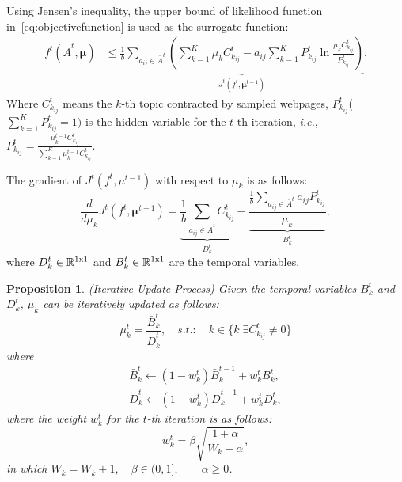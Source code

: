 \documentclass[runningheads]{llncs}
\begin{document}
Using Jensen's inequality, the upper bound of likelihood function in~\eqref{eq:objectivefunction} is used as the surrogate function:
\begin{align}
    f^t(\bar{A}^t,\bm{\mu}) &\leqslant{\underbrace{\frac{1}{b}\sum_{a_{ij} \in \bar{A}^t} \left(\sum_{k=1}^{K}\mu_k C^t_{k_{ij}} - a_{ij}\sum_{k=1}^{K} P^t_{k_{ij}} \ln \frac{\mu_k C^t_{k_{ij}}}{P^t_{k_{ij}}}\right)}_{J^t(f^t,\bm{\mu}^{t-1})}}.
\end{align}
Where $C^t_{k_{ij}}$ means the $k$-th topic contracted by sampled webpages, $P^t_{k_{ij}}$($\sum_{k=1}^{K}P^t_{k_{ij}}=1)$ is the hidden variable for the $t$-th iteration, \emph{i.e.}, $P^t_{k_{ij}} = \frac{\mu^{t-1}_k C^t_{k_{ij}}}{\sum_{k=1}^{K}\mu^{t-1}_k C^t_{k_{ij}}}$.

The gradient of $J^t(f^t,\mu^{t-1})$ with respect to $\mu_k$ is as follows:
\begin{equation} \label{eqt:computebnkanddnk}
    \frac{d}{d\mu_k}J^t(f^t,\bm{\mu}^{t-1})=\underbrace{\frac{1}{b}\sum_{a_{ij}\in \bar{A}^t}C^t_{k_{ij}}}_{D^t_k} - \underbrace{\frac{\frac{1}{b}\sum_{a_{ij}\in \bar{A}^t} a_{ij}P^t_{k_{ij}}}{\mu_k}}_{B^t_k},
\end{equation}
where $D^t_k\in \mathbb{R}^{1 \rm x 1}$ and $B^t_k\in \mathbb{R}^{1 \rm x 1}$ are the temporal variables.

\newtheorem{mydef}{Definition}
\newtheorem{mythe}{Theorem}
\newtheorem{mypro}{Proposition}
\newtheorem{mylemma}{Lemma}

\begin{mypro}(Iterative Update Process) Given the temporal variables $B^t_k$ and $D^t_k$, $\mu_k$ can be iteratively updated as follows:
\begin{equation} \label{eqt:updatemu}
    \mu^t_k = \frac{\bar{B}^t_k}{\bar{D}^t_k}, \quad s.t.:\quad k \in \{k|\exists C^t_{k_{ij}} \neq 0\}
\end{equation}
where
\begin{equation} \label{eqt:iterativeupdating}
\begin{split}
    \bar{B}^t_k \leftarrow (1-w^t_k)\bar{B}^{t-1}_k + w^t_kB^t_k,\\
    \bar{D}^t_k \leftarrow (1-w^t_k)\bar{D}^{t-1}_k + w^t_kD^t_k,
\end{split}
\end{equation}
where the weight $w^t_k$ for the $t$-th iteration is as follows:
\begin{equation} \label{eqt:weightupdate}
    w^t_k = \beta\sqrt{\frac{1+\alpha}{W_k+\alpha}},
\end{equation}
in which $  W_k = W_k + 1, \quad \beta \in (0,1], \qquad \alpha \geq 0$.
\end{mypro}
\end{document}
